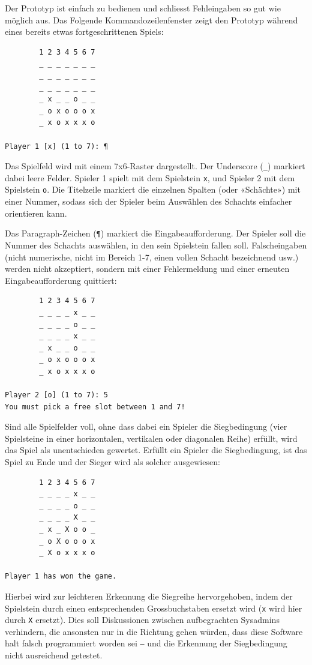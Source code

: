 \documentclass[a4paper,11pt,hidelinks]{scrartcl}
\begin{document}
Der Prototyp ist einfach zu bedienen und schliesst Fehleingaben so gut wie möglich aus. Das Folgende Kommandozeilenfenster zeigt den Prototyp während eines bereits etwas fortgeschrittenen Spiels:

\begin{lstlisting}
        1 2 3 4 5 6 7
        _ _ _ _ _ _ _
        _ _ _ _ _ _ _
        _ _ _ _ _ _ _
        _ x _ _ o _ _
        _ o x o o o x
        _ x o x x x o

Player 1 [x] (1 to 7): ¶
\end{lstlisting}

Das Spielfeld wird mit einem 7x6-Raster dargestellt. Der Underscore (\texttt{\_}) markiert dabei leere Felder. Spieler 1 spielt mit dem Spielstein \texttt{x}, und Spieler 2 mit dem Spielstein \texttt{o}. Die Titelzeile markiert die einzelnen Spalten (oder «Schächte») mit einer Nummer, sodass sich der Spieler beim Auswählen des Schachts einfacher orientieren kann.

Das Paragraph-Zeichen (\texttt{¶}) markiert die Eingabeaufforderung. Der Spieler soll die Nummer des Schachts auswählen, in den sein Spielstein fallen soll. Falscheingaben (nicht numerische, nicht im Bereich 1-7, einen vollen Schacht bezeichnend usw.) werden nicht akzeptiert, sondern mit einer Fehlermeldung und einer erneuten Eingabeaufforderung quittiert:

\begin{lstlisting}
        1 2 3 4 5 6 7
        _ _ _ _ x _ _
        _ _ _ _ o _ _
        _ _ _ _ x _ _
        _ x _ _ o _ _
        _ o x o o o x
        _ x o x x x o

Player 2 [o] (1 to 7): 5
You must pick a free slot between 1 and 7!
\end{lstlisting}

Sind alle Spielfelder voll, ohne dass dabei ein Spieler die Siegbedingung (vier Spielsteine in einer horizontalen, vertikalen oder diagonalen Reihe) erfüllt, wird das Spiel als unentschieden gewertet. Erfüllt ein Spieler die Siegbedingung, ist das Spiel zu Ende und der Sieger wird als solcher ausgewiesen:

\begin{lstlisting}
        1 2 3 4 5 6 7
        _ _ _ _ x _ _
        _ _ _ _ o _ _
        _ _ _ _ X _ _
        _ x _ X o o _
        _ o X o o o x
        _ X o x x x o

Player 1 has won the game.
\end{lstlisting}

Hierbei wird zur leichteren Erkennung die Siegreihe hervorgehoben, indem der Spielstein durch einen entsprechenden Grossbuchstaben ersetzt wird (\texttt{x} wird hier durch \texttt{X} ersetzt). Dies soll Diskussionen zwischen aufbegrachten Sysadmins verhindern, die ansonsten nur in die Richtung gehen würden, dass diese Software halt falsch programmiert worden sei ‒ und die Erkennung der Siegbedingung nicht ausreichend getestet.
\end{document}
